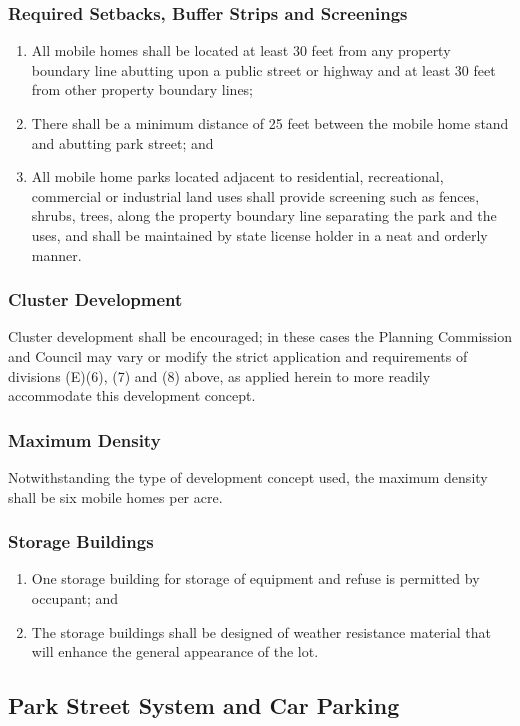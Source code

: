 \subsubsection{Required Setbacks, Buffer Strips and Screenings}
\begin{enumerate}[{\indent}a)]
    \item All mobile homes shall be located at least 30 feet from any property boundary line abutting upon a public street or highway and at least 30 feet from other property boundary lines; 
    \item There shall be a minimum distance of 25 feet between the mobile home stand and abutting park street; and 
    \item All mobile home parks located adjacent to residential, recreational, commercial or industrial land uses shall provide screening such as fences, shrubs, trees, along the property boundary line separating the park and the uses, and shall be maintained by state license holder in a neat and orderly manner.
\end{enumerate}
\subsubsection{Cluster Development}
Cluster development shall be encouraged; in these cases the Planning Commission and Council may vary or modify the strict application and requirements of divisions (E)(6), (7) and (8) above, as applied herein to more readily accommodate this development concept.
\subsubsection{Maximum Density}
Notwithstanding the type of development concept used, the maximum density shall be six mobile homes per acre.
\subsubsection{Storage Buildings}
\begin{enumerate}[{\indent}a)]
    \item One storage building for storage of equipment and refuse is permitted by occupant; and 
    \item The storage buildings shall be designed of weather resistance material that will enhance the general appearance of the lot.
\end{enumerate}
\subsection{Park Street System and Car Parking}
